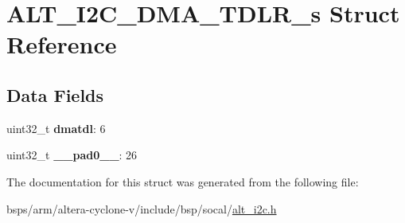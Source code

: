 \hypertarget{structALT__I2C__DMA__TDLR__s}{}\section{A\+L\+T\+\_\+\+I2\+C\+\_\+\+D\+M\+A\+\_\+\+T\+D\+L\+R\+\_\+s Struct Reference}
\label{structALT__I2C__DMA__TDLR__s}
\subsection*{Data Fields}
\begin{DoxyCompactItemize}
\item 
\mbox{\label{structALT__I2C__DMA__TDLR__s_a5cbf8102667eec9cdb793f98e4940b61}} 
uint32\+\_\+t {\bfseries dmatdl}\+: 6
\item 
\mbox{\label{structALT__I2C__DMA__TDLR__s_a34e8d28959f98f7b0b299a116ea65288}} 
uint32\+\_\+t {\bfseries \+\_\+\+\_\+pad0\+\_\+\+\_\+}\+: 26
\end{DoxyCompactItemize}


The documentation for this struct was generated from the following file\+:\begin{DoxyCompactItemize}
\item 
bsps/arm/altera-\/cyclone-\/v/include/bsp/socal/\mbox{\hyperlink{socal_2alt__i2c_8h}{alt\+\_\+i2c.\+h}}\end{DoxyCompactItemize}
